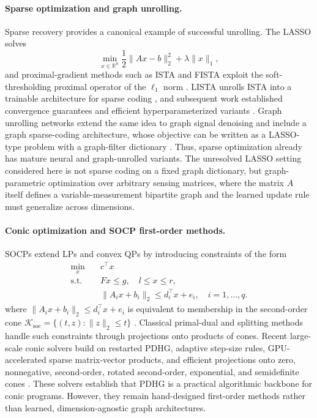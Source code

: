 \documentclass[10pt,twocolumn]{article}
\begin{document}
\paragraph{Sparse optimization and graph unrolling.}
Sparse recovery provides a canonical example of successful unrolling.
The LASSO \citep{tibshirani1996lasso} solves
\begin{equation}
    \min_{x\in\mathbb{R}^n}
    \frac{1}{2}\|Ax-b\|_2^2 + \lambda\|x\|_1 ,
    \label{eq:lasso}
\end{equation}
and proximal-gradient methods such as ISTA and FISTA exploit the soft-thresholding proximal operator of the $\ell_1$ norm \citep{beck2009fista}.
LISTA unrolls ISTA into a trainable architecture for sparse coding \citep{gregor2010lista}, and subsequent work established convergence guarantees and efficient hyperparameterized variants \citep{chen2018linearlista,chen2021hyperlista}.
Graph unrolling networks extend the same idea to graph signal denoising and include a graph sparse-coding architecture, whose objective can be written as a LASSO-type problem with a graph-filter dictionary \citep{chen2021graphunrolling}.
Thus, sparse optimization already has mature neural and graph-unrolled variants.
The unresolved LASSO setting considered here is not sparse coding on a fixed graph dictionary, but graph-parametric optimization over arbitrary sensing matrices, where the matrix $A$ itself defines a variable-measurement bipartite graph and the learned update rule must generalize across dimensions.

\paragraph{Conic optimization and SOCP first-order methods.}
SOCPs extend LPs and convex QPs by introducing constraints of the form
\begin{equation}
\begin{aligned}
    \min_x \quad & c^\top x \\
    \text{s.t.}\quad & Fx \leq g,\quad l\leq x\leq r,\\
    & \|A_i x+b_i\|_2 \leq d_i^\top x+e_i,\quad i=1,\ldots,q .
\end{aligned}
\label{eq:socp}
\end{equation}
where $\|A_i x+b_i\|_2 \leq d_i^\top x+e_i$ is equivalent to membership in the second-order cone $\mathcal{K}_{\mathrm{soc}}=\{(t,z):\|z\|_2\leq t\}$ \citep{lobo1998socp}.
Classical primal-dual and splitting methods handle such constraints through projections onto products of cones.
Recent large-scale conic solvers build on restarted PDHG, adaptive step-size rules, GPU-accelerated sparse matrix-vector products, and efficient projections onto zero, nonnegative, second-order, rotated second-order, exponential, and semidefinite cones \citep{lin2026pdcs}.
These solvers establish that PDHG is a practical algorithmic backbone for conic programs.
However, they remain hand-designed first-order methods rather than learned, dimension-agnostic graph architectures.
\end{document}
